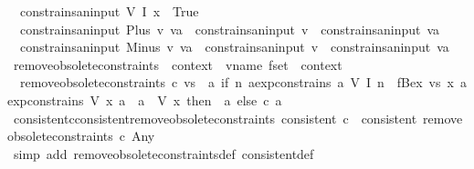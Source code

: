 \begin{isabellebody}
\ \ {\isachardoublequoteopen}constrains{\isacharunderscore}an{\isacharunderscore}input\ {\isacharparenleft}V\ {\isacharparenleft}I\ x{\isacharparenright}{\isacharparenright}\ {\isacharequal}\ True{\isachardoublequoteclose}\ {\isacharbar}\isanewline
\ \ {\isachardoublequoteopen}constrains{\isacharunderscore}an{\isacharunderscore}input\ {\isacharparenleft}Plus\ v\ va{\isacharparenright}\ {\isacharequal}\ {\isacharparenleft}constrains{\isacharunderscore}an{\isacharunderscore}input\ v\ {\isasymor}\ constrains{\isacharunderscore}an{\isacharunderscore}input\ va{\isacharparenright}{\isachardoublequoteclose}\ {\isacharbar}\isanewline
\ \ {\isachardoublequoteopen}constrains{\isacharunderscore}an{\isacharunderscore}input\ {\isacharparenleft}Minus\ v\ va{\isacharparenright}\ {\isacharequal}\ {\isacharparenleft}constrains{\isacharunderscore}an{\isacharunderscore}input\ v\ {\isasymor}\ constrains{\isacharunderscore}an{\isacharunderscore}input\ va{\isacharparenright}{\isachardoublequoteclose}\isanewline
\isanewline
{}\isamarkupfalse%
\ remove{\isacharunderscore}obsolete{\isacharunderscore}constraints\ {\isacharcolon}{\isacharcolon}\ {\isachardoublequoteopen}context\ {\isasymRightarrow}\ vname\ fset\ {\isasymRightarrow}\ context{\isachardoublequoteclose}\ \isanewline
\ \ {\isachardoublequoteopen}remove{\isacharunderscore}obsolete{\isacharunderscore}constraints\ c\ vs\ {\isacharequal}\ {\isacharparenleft}{\isasymlambda}a{\isachardot}\ if\ {\isasymexists}n{\isachardot}\ aexp{\isacharunderscore}constrains\ a\ {\isacharparenleft}V\ {\isacharparenleft}I\ n{\isacharparenright}{\isacharparenright}\ {\isasymor}\ fBex\ vs\ {\isacharparenleft}{\isasymlambda}x{\isachardot}\ aexp{\isacharunderscore}constrains\ {\isacharparenleft}V\ x{\isacharparenright}\ a\ {\isasymand}\ a\ {\isasymnoteq}\ {\isacharparenleft}V\ x{\isacharparenright}{\isacharparenright}\ then\ {\isasymlbrakk}{\isasymrbrakk}\ a\ else\ c\ a{\isacharparenright}{\isachardoublequoteclose}\isanewline
\isanewline
{}\isamarkupfalse%
\ consistent{\isacharunderscore}c{\isacharunderscore}consistent{\isacharunderscore}remove{\isacharunderscore}obsolete{\isacharunderscore}constraints{\isacharcolon}\ {\isachardoublequoteopen}consistent\ c\ {\isasymLongrightarrow}\ consistent\ {\isacharparenleft}remove{\isacharunderscore}obsolete{\isacharunderscore}constraints\ c\ Any{\isacharparenright}{\isachardoublequoteclose}\isanewline
%
\isadelimproof
\ \ %
\endisadelimproof
%
\isatagproof
{}\isamarkupfalse%
\ {\isacharparenleft}simp\ add{\isacharcolon}\ remove{\isacharunderscore}obsolete{\isacharunderscore}constraints{\isacharunderscore}def\ consistent{\isacharunderscore}def{\isacharparenright}\isanewline

\end{isabellebody}
